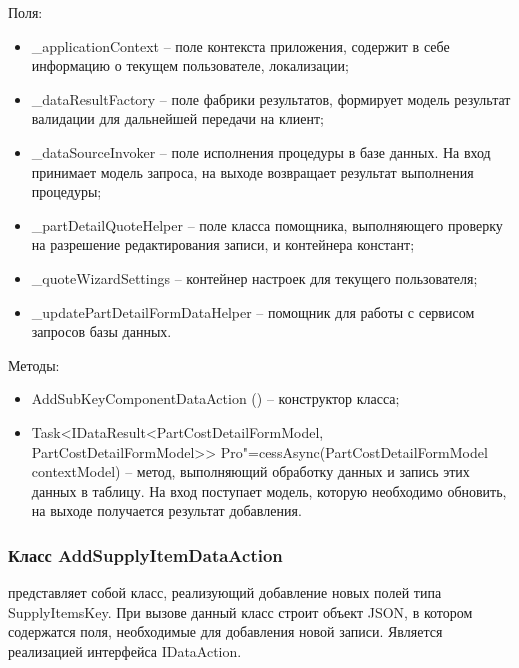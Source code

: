 Поля:
\begin{itemize}
  \item \_applicationContext – поле контекста приложения, содержит в себе информацию о текущем пользователе, локализации;
  \item \_dataResultFactory – поле фабрики результатов, формирует модель результат валидации для дальнейшей передачи на клиент;
  \item \_dataSourceInvoker – поле исполнения процедуры в базе данных. На вход принимает модель запроса, на выходе возвращает результат выполнения процедуры;
  \item \_partDetailQuoteHelper – поле класса помощника, выполняющего проверку на разрешение редактирования записи, и контейнера констант;
  \item \_quoteWizardSettings – контейнер настроек для текущего пользователя;
  \item \_updatePartDetailFormDataHelper – помощник для работы с сервисом запросов базы данных.
\end{itemize}

Методы:
\begin{itemize}
  \item AddSubKeyComponentDataAction () – конструктор класса;
  \item Task<IDataResult<PartCostDetailFormModel, PartCostDetailFormModel>> Pro"=cessAsync(PartCostDetailFormModel contextModel) – метод, выполняющий обработку данных и запись этих данных в таблицу. На вход поступает модель, которую необходимо обновить, на выходе получается результат добавления.
\end{itemize}

\subsubsection{Класс AddSupplyItemDataAction }
\label{sub:arch_and_mod:data_layer:add_supply_item}

представляет собой класс, реализующий добавление новых полей типа SupplyItemsKey. При вызове данный класс строит объект JSON, в котором содержатся поля, необходимые для добавления новой записи. Является реализацией интерфейса IDataAction.

